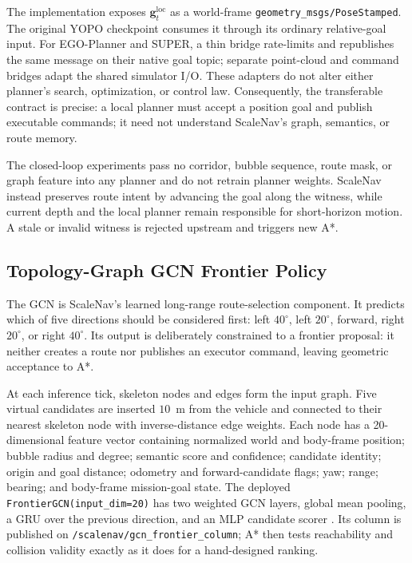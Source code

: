 \documentclass[letterpaper,10pt,conference]{ieeeconf}
\newcommand{\vect}[1]{\boldsymbol{#1}}
\begin{document}
The implementation exposes $\vect{g}^{\mathrm{loc}}_t$ as a world-frame
\texttt{geometry\_msgs/PoseStamped}.  The original YOPO checkpoint consumes it
through its ordinary relative-goal input.  For EGO-Planner and SUPER, a thin
bridge rate-limits and republishes the same message on their native goal topic;
separate point-cloud and command bridges adapt the shared simulator I/O.  These
adapters do not alter either planner's search, optimization, or control law.
Consequently, the transferable contract is precise: a local planner must
accept a position goal and publish executable commands; it need not understand
ScaleNav's graph, semantics, or route memory.

The closed-loop experiments pass no corridor, bubble sequence, route mask, or
graph feature into any planner and do not retrain planner weights.  ScaleNav
instead preserves route intent by advancing the goal along the witness, while
current depth and the local planner remain responsible for short-horizon
motion.  A stale or invalid witness is rejected upstream and triggers new A*.

\subsection{Topology-Graph GCN Frontier Policy}
\label{sec:gcn}
The GCN is ScaleNav's learned long-range route-selection component.  It
predicts which of five directions should be considered first: left $40^\circ$,
left $20^\circ$, forward, right $20^\circ$, or right $40^\circ$.  Its output is
deliberately constrained to a frontier proposal: it neither creates a route
nor publishes an executor command, leaving geometric acceptance to A*.

At each inference tick, skeleton nodes and edges form the input graph.  Five
virtual candidates are inserted $10$~m from the vehicle and connected to their
nearest skeleton node with inverse-distance edge weights.  Each node has a
20-dimensional feature vector containing normalized world and body-frame
position; bubble radius and degree; semantic score and confidence; candidate
identity; origin and goal distance; odometry and forward-candidate flags; yaw;
range; bearing; and body-frame mission-goal state.  The deployed
\texttt{FrontierGCN(input\_dim=20)} has two weighted GCN layers, global mean
pooling, a GRU over the previous direction, and an MLP candidate scorer
\cite{kipf2017gcn}.  Its
column is published on \texttt{/scalenav/gcn\_frontier\_column}; A* then tests
reachability and collision validity exactly as it does for a hand-designed
ranking.
\end{document}
